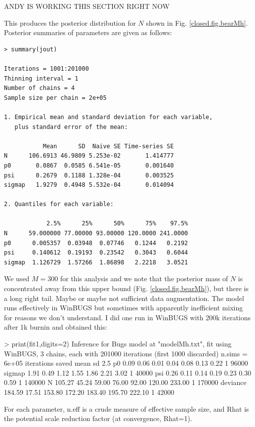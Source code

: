 ANDY IS WORKING THIS SECTION RIGHT NOW

This produces the posterior distribution for $N$ shown
in Fig. \ref{closed.fig.bearMh}. Posterior summaries of parameters are
given as follows:
{\small
\begin{verbatim}
> summary(jout)

Iterations = 1001:201000
Thinning interval = 1 
Number of chains = 4 
Sample size per chain = 2e+05 

1. Empirical mean and standard deviation for each variable,
   plus standard error of the mean:

           Mean      SD  Naive SE Time-series SE
N      106.6913 46.9809 5.253e-02       1.414777
p0       0.0867  0.0585 6.541e-05       0.001640
psi      0.2679  0.1188 1.328e-04       0.003525
sigmap   1.9279  0.4948 5.532e-04       0.014094

2. Quantiles for each variable:

            2.5%      25%      50%      75%    97.5%
N      59.000000 77.00000 93.00000 120.0000 241.0000
p0      0.005357  0.03948  0.07746   0.1244   0.2192
psi     0.140612  0.19193  0.23542   0.3043   0.6044
sigmap  1.126729  1.57266  1.86898   2.2218   3.0521
\end{verbatim}
}
We used $M=300$ for this analysis and we
note that the posterior mass of $N$ is concentrated away from this
upper bound (Fig. \ref{closed.fig.bearMh}), but there is a long right tail. Maybe or
maybe not sufficient data augmentation.
The model runs effectively in WinBUGS but sometimes with apparently
inefficient mixing for reasons we don't understand.
I did one run in WinBUGS with 200k iterations after 1k burnin and
obtained this:


> print(fit1,digits=2)
Inference for Bugs model at "modelMh.txt", fit using WinBUGS,
 3 chains, each with 201000 iterations (first 1000 discarded)
 n.sims = 6e+05 iterations saved
           mean    sd   2.5%
p0         0.09  0.06   0.01   0.04   0.08   0.13   0.22    1  96000
sigmap     1.91  0.49   1.12   1.55   1.86   2.21   3.02    1  40000
psi        0.26  0.11   0.14   0.19   0.23   0.30   0.59    1 140000
N        105.27 45.24  59.00  76.00  92.00 120.00 233.00    1 170000
deviance 184.59 17.51 153.80 172.20 183.40 195.70 222.10    1  42000

For each parameter, n.eff is a crude measure of effective sample size,
and Rhat is the potential scale reduction factor (at convergence, Rhat=1).

